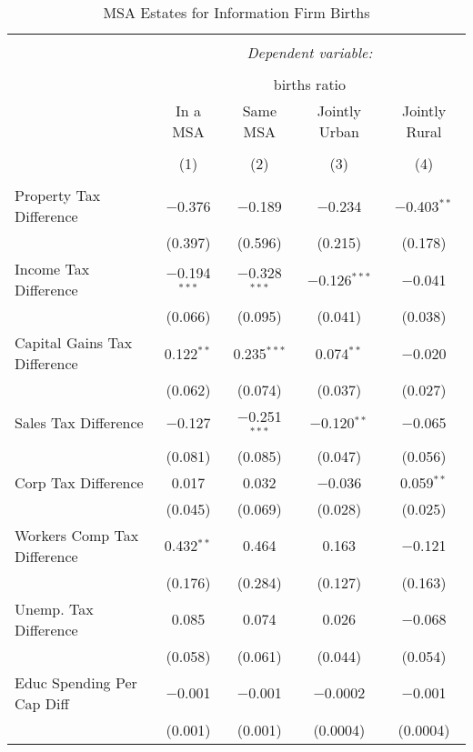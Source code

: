 
\begin{table}[!htbp] \centering 
  \caption{MSA Estates for  Information Firm Births} 
  \label{} 
\begin{tabular}{@{\extracolsep{5pt}}lcccc} 
\\[-1.8ex]\hline 
\hline \\[-1.8ex] 
 & \multicolumn{4}{c}{\textit{Dependent variable:}} \\ 
\cline{2-5} 
\\[-1.8ex] & \multicolumn{4}{c}{births ratio} \\ 
 & In a MSA & Same MSA & Jointly Urban & Jointly Rural \\ 
\\[-1.8ex] & (1) & (2) & (3) & (4)\\ 
\hline \\[-1.8ex] 
 Property Tax Difference & $-$0.376 & $-$0.189 & $-$0.234 & $-$0.403$^{**}$ \\ 
  & (0.397) & (0.596) & (0.215) & (0.178) \\ 
  Income Tax Difference & $-$0.194$^{***}$ & $-$0.328$^{***}$ & $-$0.126$^{***}$ & $-$0.041 \\ 
  & (0.066) & (0.095) & (0.041) & (0.038) \\ 
  Capital Gains Tax Difference & 0.122$^{**}$ & 0.235$^{***}$ & 0.074$^{**}$ & $-$0.020 \\ 
  & (0.062) & (0.074) & (0.037) & (0.027) \\ 
  Sales Tax Difference & $-$0.127 & $-$0.251$^{***}$ & $-$0.120$^{**}$ & $-$0.065 \\ 
  & (0.081) & (0.085) & (0.047) & (0.056) \\ 
  Corp Tax Difference & 0.017 & 0.032 & $-$0.036 & 0.059$^{**}$ \\ 
  & (0.045) & (0.069) & (0.028) & (0.025) \\ 
  Workers Comp Tax Difference & 0.432$^{**}$ & 0.464 & 0.163 & $-$0.121 \\ 
  & (0.176) & (0.284) & (0.127) & (0.163) \\ 
  Unemp. Tax Difference & 0.085 & 0.074 & 0.026 & $-$0.068 \\ 
  & (0.058) & (0.061) & (0.044) & (0.054) \\ 
  Educ Spending Per Cap Diff & $-$0.001 & $-$0.001 & $-$0.0002 & $-$0.001 \\ 
  & (0.001) & (0.001) & (0.0004) & (0.0004) \\ 

\end{tabular}
\end{table}
